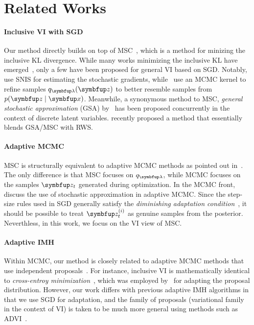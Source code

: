 
\section{Related Works}\label{section:related}
\paragraph{Inclusive VI with SGD}
Our method directly builds on top of MSC~\citep{NEURIPS2020_b2070693}, which is a method for minizing the inclusive KL divergence.
While many works minimizing the inclusive KL have emerged~\citep{DBLP:journals/corr/BornscheinB14, li_approximate_2017, 10.5555/2074022.2074067, pmlr-v124-ou20a, kim2021adaptive}, only a few have been proposed for general VI based on SGD.
Notably,~\citet{DBLP:journals/corr/BornscheinB14} use SNIS for estimating the stochastic gradients, while~\citet{li_approximate_2017} use an MCMC kernel to refine samples \(q_{\vlambda}(\vz)\) to better resemble samples from \(p(\vz\mid\vx)\).
Meanwhile, a synonymous method to MSC, \textit{general stochastic approximation} (GSA) by~\citet[Algorithm 1]{pmlr-v124-ou20a} has been proposed concurrently in the context of discrete latent variables.
\citet{kim2021adaptive} recently proposed a method that essentially blends GSA/MSC with RWS.

\vspace{-0.1in}
\paragraph{Adaptive MCMC}
MSC is structurally equivalent to adaptive MCMC methods as pointed out in~\cite{pmlr-v124-ou20a}.
The only difference is that MSC focuses on \(q_{\vlambda}\), while MCMC focuses on the samples \(\vz_t\) generated during optimization.
In the MCMC front, \citet{10.1007/s11222-008-9110-y, garthwaite_adaptive_2016} discuss the use of stochastic approximation in adaptive MCMC.
Since the step-size rules used in SGD generally satisfy the \textit{diminishing adaptation condition}~\cite{10.1007/s11222-008-9110-y}, it should be possible to treat \(\vz^{(i)}_t\) as genuine samples from the posterior.
Neverthless, in this work, we focus on the VI view of MSC.

\vspace{-0.1in}
\paragraph{Adaptive IMH}
Within MCMC, our method is closely related to adaptive MCMC methods that use independent proposals~\citep{andrieu_ergodicity_2006, keith_adaptive_2008, holden_adaptive_2009, giordani_adaptive_2010}.
For instance, inclusive VI is mathematically identical to \textit{cross-entroy minimization}~\citet{barbakh_cross_2009}, which was employed by~\citet{keith_adaptive_2008} for adapting the proposal distribution.
However, our work differs with previous adaptive IMH algorithms in that we use SGD for adaptation, and the family of proposals (variational family in the context of VI) is taken to be much more general using methods such as ADVI~\citep{JMLR:v18:16-107}.

